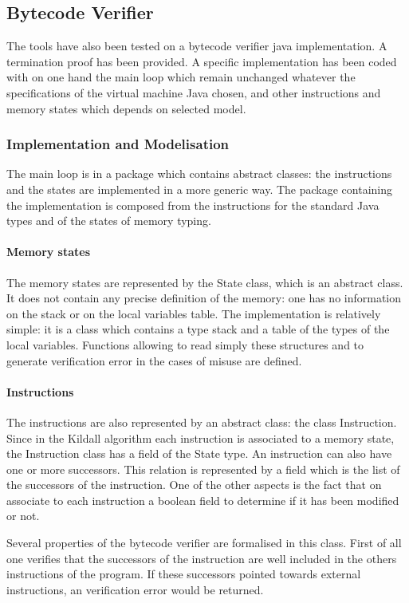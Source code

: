\subsection{Bytecode Verifier}
The tools have also been tested on a bytecode verifier java implementation. A termination proof has been provided.
A specific implementation has been coded with on one hand the main loop which remain unchanged whatever the specifications of the virtual machine Java chosen, and other instructions and memory states which depends on selected model.
\subsubsection{Implementation and Modelisation}
The main loop is in a package which contains abstract classes: 
the instructions and the states are implemented in a more generic way.
The package containing the implementation is composed from the instructions for the standard Java types and of the states of memory typing. 
\paragraph {Memory states}
The memory states are represented by the State class, which is an abstract class.  It does not contain any precise definition of the memory: 
one has no information on the stack or on the local variables table. 
The implementation is relatively simple: 
it is a class which contains a type stack and a table of the types of the local variables. 
Functions allowing to read simply these structures and to generate verification error in the cases of misuse are defined.   
\paragraph{Instructions}
The instructions are also represented by an abstract class: 
the class Instruction.  
Since in the Kildall algorithm each instruction is associated to a memory state,  the Instruction class has a field of the State type. 
An instruction can also have one or more successors. 
This relation is represented by a field which is the list of the successors of the instruction.  
One of the other aspects is the fact that on associate to each instruction a boolean field to determine if it has been modified or not.

Several properties of the bytecode verifier are formalised in this class.
First of all one verifies that the successors of the instruction are well included in the others instructions of the program. 
If these successors pointed towards external instructions, an verification error would be returned. 


